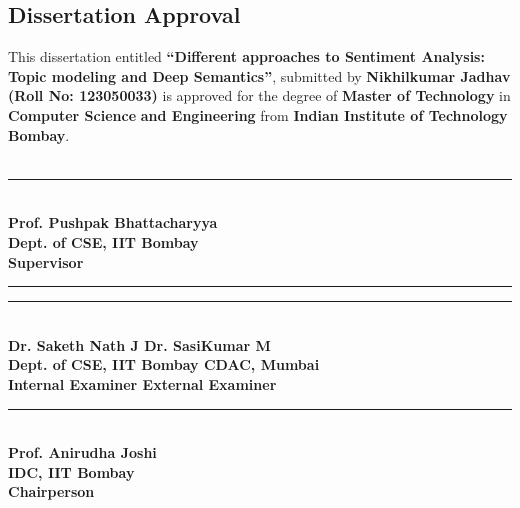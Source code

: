 %
%
\begin{center}
\section*{Dissertation Approval}
\end{center}
This dissertation entitled \textbf{``Different approaches to Sentiment Analysis: Topic modeling and Deep Semantics''}, submitted by \textbf{Nikhilkumar Jadhav} \textbf{(Roll No: 123050033)} is approved for the degree of \textbf{Master of Technology} in \textbf{Computer Science} \textbf{and Engineering} from \textbf{Indian Institute of Technology Bombay}.\\
\vspace{1.25in}\\
\begin{center}
\rule{200pt}{1pt} \\
\textbf{Prof. Pushpak Bhattacharyya\\
Dept. of CSE, IIT Bombay\\
Supervisor}
\end{center}
\vspace{1in}
\rule{180pt}{1pt} \hfill \rule{210pt}{1pt} \\
\textbf{Dr. Saketh Nath J \hfill Dr. SasiKumar M\\
Dept. of CSE, IIT Bombay \hfill CDAC, Mumbai\\
Internal Examiner \hfill External Examiner}
\vspace{1in}
\begin{center}
\rule{150pt}{1pt} \\
\textbf{Prof. Anirudha Joshi\\
IDC, IIT Bombay\\
Chairperson}
\end{center}

%